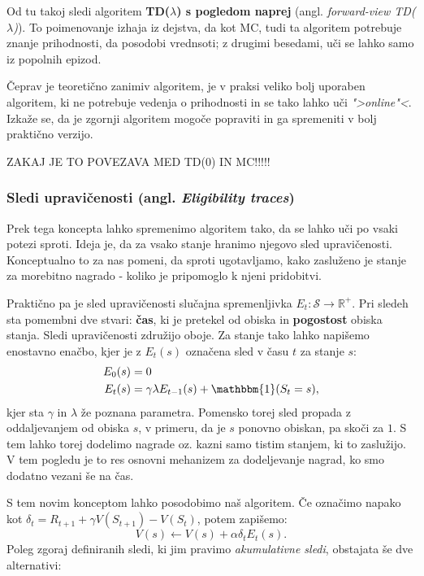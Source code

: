 \documentclass[12pt,a4paper]{amsart}
\theoremstyle{definition} %
\theoremstyle{plain} %
\begin{document}
Od tu takoj sledi algoritem \textbf{TD($\lambda$) s pogledom naprej} (angl. \textit{forward-view 
TD($\lambda$)}). To poimenovanje izhaja iz dejstva, da kot MC, tudi ta algoritem potrebuje znanje
prihodnosti, da posodobi vrednsoti; z drugimi besedami, uči se lahko samo iz popolnih epizod.

Čeprav je teoretično zanimiv algoritem, je v praksi veliko bolj uporaben algoritem, ki ne potrebuje
vedenja o prihodnosti in se tako lahko uči \textit{">online"<}. Izkaže se, da je zgornji algoritem 
mogoče popraviti in ga spremeniti v bolj praktično verzijo.

ZAKAJ JE TO POVEZAVA MED TD(0) IN MC!!!!!

\subsubsection{Sledi upravičenosti (angl. \textit{Eligibility traces})}
Prek tega koncepta lahko spremenimo algoritem tako, da se lahko uči po vsaki potezi sproti. Ideja 
je, da za vsako stanje hranimo njegovo sled upravičenosti. Konceptualno to za nas pomeni, da sproti 
ugotavljamo, kako zasluženo je stanje za morebitno nagrado - koliko je pripomoglo k njeni 
pridobitvi.

Praktično pa je sled upravičenosti slučajna spremenljivka $E_t: \mathcal{S} \rightarrow \mathbb{R}^+$. 
Pri sledeh sta pomembni dve stvari: \textbf{čas}, ki je pretekel od obiska in \textbf{pogostost} 
obiska stanja. Sledi upravičenosti združijo oboje. Za stanje tako lahko napišemo enostavno enačbo, 
kjer je z $E_t(s)$ označena sled v času $t$ za stanje $s$:
\begin{align*}
    E_0(s) &= 0 \\
    E_t(s) &= \gamma \lambda E_{t-1}(s) + \mathbbm{1}(S_t = s),
\end{align*}
kjer sta $\gamma$ in $\lambda$ že poznana parametra. Pomensko torej sled propada z oddaljevanjem 
od obiska $s$, v primeru, da je $s$ ponovno obiskan, pa skoči za $1$. S tem lahko torej dodelimo 
nagrade oz. kazni samo tistim stanjem, ki to zaslužijo. V tem pogledu je to res osnovni mehanizem 
za dodeljevanje nagrad, ko smo dodatno vezani še na čas.

S tem novim konceptom lahko posodobimo naš algoritem. Če označimo napako kot $\delta_t = R_{t+1} + 
\gamma V(S_{t+1}) - V(S_t)$, potem zapišemo: 
\begin{equation}\label{TDlambda}
    V(s) \leftarrow V(s) + \alpha \delta_t E_t(s).
\end{equation}
Poleg zgoraj definiranih sledi, ki jim pravimo \textit{akumulativne sledi}, obstajata še dve 
alternativi:
\end{document}

